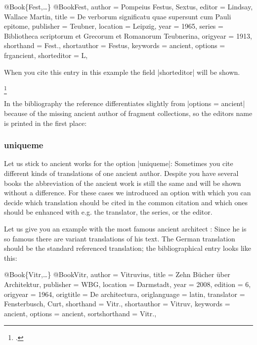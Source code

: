 \documentclass[a4paper,
10pt,
greek,
french,
spanish,
italian,
ngerman,
english,
]{ltxdoc}
\begin{document}
\begin{bibexample}[label=Fest]{{@}Book\{Fest,…\}}
@Book{Fest,
  author      = {Pompeius Festus, {\relax Sex}tus},
  editor      = {Lindsay, Wallace Martin},
  title       = {De verborum significatu quae supersunt cum Pauli epitome},
  publisher   = {Teubner},
  location    = Leipzig,     %
  year        = {1965},
  series      = {Bibliotheca scriptorum et Grecorum et Romanorum Teubnerina},
  origyear    = {1913},
  shorthand   = {Fest.},
  shortauthor = {Festus},
  keywords    = {ancient},
  options     = {frgancient},
  shorteditor = {L},
}
\end{bibexample}

When you cite this entry in this example the field  |shorteditor| will be shown.
\begin{example}
\footnote{\cite[3]{Fest}.}
\end{example}

In the bibliography the reference differentiates slightly from |options = {ancient}| because of the missing ancient author of fragment collections, 
so the editors name is printed in the first place:

\subsubsection{uniqueme}\label{uniqueme}
Let us stick to ancient works for the option |uniqueme|:
Sometimes you cite different kinds of translations of one ancient author.
Despite you have several books the abbreviation of the ancient work is still the same and will be shown without a difference. 
For these cases we introduced an option with which you can decide which translation should be cited in the common citation and which ones should be enhanced with e.g. the translator, the series, or the editor.

Let us give you an example with the most famous ancient architect \citeauthor{Vitr}:
Since he is so famous there are variant translations of his text.
The German translation should be the standard referenced translation;
the bibliographical entry looks like this:
\begin{bibexample}[label=Vitr]{{@}Book\{Vitr,…\}}
@Book{Vitr,
  author        = {Vitruvius},
  title         = {Zehn Bücher über Architektur},
  publisher     = WBG, %
  location      = {Darmstadt},
  year          = {2008},
  edition       = {6},
  origyear      = {1964},
  origtitle     = {De architectura},
  origlanguage  = {latin},
  translator    = {Fensterbusch, Curt},
  shorthand     = {Vitr.},
  shortauthor   = {Vitruv},
  keywords      = {ancient},
  options       = {ancient},
  sortshorthand = {Vitr.},
}
\end{bibexample}
\end{document}
